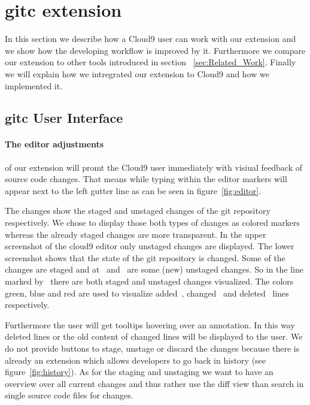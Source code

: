 \section{gitc extension}
\label{sec:Extension}
In this section we describe how a Cloud9 user can work with our extension and we show how the developing workflow is improved by it.
Furthermore we compare our extension to other tools introduced in section ~\ref{sec:Related_Work}.
Finally we will explain how we intregrated our extension to Cloud9 and how we implemented it.

\subsection{gitc User Interface}
\label{sec:gitc_ui}
\paragraph{The editor adjustments} of our extension will promt the Cloud9 user immediately with visiual feedback of source code changes.
That means while typing within the editor markers will appear next to the left gutter line as can be seen in figure~\ref{fig:editor}.

The changes show the staged and unstaged changes of the git repository respectively.
We chose to display those both types of changes as colored markers whereas the already staged changes are more transparent.
In the upper screenshot of the cloud9 editor only unstaged changes are displayed.
The lower screenshot shows that the state of the git repository is changed.
Some of the changes are staged and at~ and~ are some (new) unstaged changes.
So in the line marked by~ there are both staged and unstaged changes visualized.
The colors green, blue and red are used to visualize added~, changed~ and deleted~ lines respectively.

Furthermore the user will get tooltips hovering over an annotation.
In this way deleted lines or the old content of changed lines will be displayed to the user.
We do not provide buttons to stage, unstage or discard the changes because there is already an extension which allows developers to go back in history (see figure~\ref{fig:history}).
As for the staging and unstaging we want to have an overview over all current changes and thus rather use the diff view than search in single source code files for changes.

